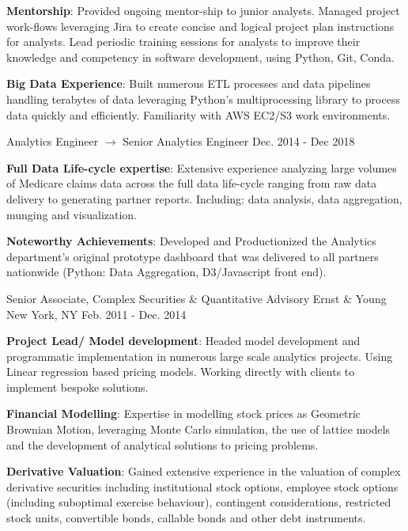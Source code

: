 \begin{cventries}
{\begin{cvitems}
          \item {\textbf{Mentorship}: Provided ongoing mentor-ship to junior analysts. Managed project work-flows leveraging Jira to create concise and logical project plan instructions for analysts. Lead periodic training sessions for analysts to improve their knowledge and competency in software development, using Python, Git, Conda.}
          \item {\textbf{Big Data Experience}: Built numerous ETL processes and data pipelines handling terabytes of data leveraging Python's multiprocessing library to process data quickly and efficiently. Familiarity with AWS EC2/S3 work environments.}          
      \end{cvitems}
    }
  \cventry
    {Analytics Engineer $\rightarrow$ Senior Analytics Engineer}
    {}
    {}
    {Dec. 2014 - Dec 2018}
    {
      \begin{cvitems}
          \item {\textbf{Full Data Life-cycle expertise}: Extensive experience analyzing large volumes of Medicare claims data across the full data life-cycle ranging from raw data delivery to generating partner reports. Including: data analysis, data aggregation, munging and visualization.
          }
          \item {\textbf{Noteworthy Achievements}: Developed and Productionized the Analytics department's original prototype dashboard that was delivered to all partners nationwide (Python: Data Aggregation, D3/Javascript front end).
          }
      \end{cvitems}
    }
  \cventry
    {Senior Associate, Complex Securities \& Quantitative Advisory}
    {Ernst \& Young}
    {New York, NY}
    {Feb. 2011 - Dec. 2014}
    {
      \begin{cvitems}
        \item {\textbf{Project Lead/ Model development}: Headed model development and programmatic implementation in numerous large scale analytics projects. Using Linear regression based pricing models. Working directly with clients to implement bespoke solutions.}
        \item {\textbf{Financial Modelling}: Expertise in modelling stock prices as Geometric Brownian Motion, leveraging Monte Carlo simulation, the use of lattice models and the development of analytical solutions to pricing problems.}
        \item {\textbf{Derivative Valuation}: Gained extensive experience in the valuation of complex derivative securities including institutional stock options, employee stock options (including suboptimal exercise behaviour), contingent considerations, restricted stock units, convertible bonds, callable bonds and other debt instruments.}

\end{cvitems}}
\end{cventries}
